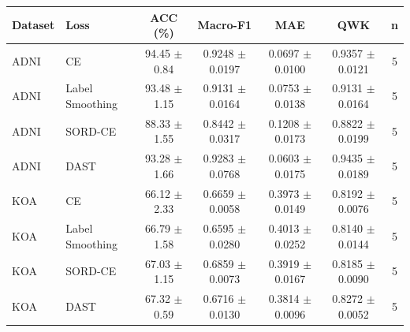 \begin{tabular}{llccccc}
\toprule
Dataset & Loss & ACC (\%) & Macro-F1 & MAE & QWK & n \\
\midrule
ADNI & CE & 94.45 $\pm$ 0.84 & 0.9248 $\pm$ 0.0197 & 0.0697 $\pm$ 0.0100 & 0.9357 $\pm$ 0.0121 & 5 \\
ADNI & Label Smoothing & 93.48 $\pm$ 1.15 & 0.9131 $\pm$ 0.0164 & 0.0753 $\pm$ 0.0138 & 0.9131 $\pm$ 0.0164 & 5 \\
ADNI & SORD-CE & 88.33 $\pm$ 1.55 & 0.8442 $\pm$ 0.0317 & 0.1208 $\pm$ 0.0173 & 0.8822 $\pm$ 0.0199 & 5 \\
ADNI & DAST & 93.28 $\pm$ 1.66 & 0.9283 $\pm$ 0.0768 & 0.0603 $\pm$ 0.0175 & 0.9435 $\pm$ 0.0189 & 5 \\
KOA & CE & 66.12 $\pm$ 2.33 & 0.6659 $\pm$ 0.0058 & 0.3973 $\pm$ 0.0149 & 0.8192 $\pm$ 0.0076 & 5 \\
KOA & Label Smoothing & 66.79 $\pm$ 1.58 & 0.6595 $\pm$ 0.0280 & 0.4013 $\pm$ 0.0252 & 0.8140 $\pm$ 0.0144 & 5 \\
KOA & SORD-CE & 67.03 $\pm$ 1.15 & 0.6859 $\pm$ 0.0073 & 0.3919 $\pm$ 0.0167 & 0.8185 $\pm$ 0.0090 & 5 \\
KOA & DAST & 67.32 $\pm$ 0.59 & 0.6716 $\pm$ 0.0130 & 0.3814 $\pm$ 0.0096 & 0.8272 $\pm$ 0.0052 & 5 \\
\bottomrule
\end{tabular}
